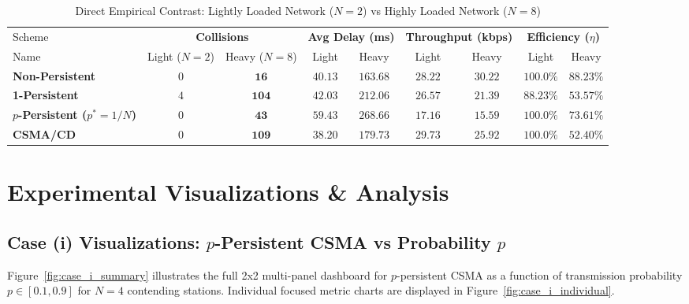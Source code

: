 \documentclass[11pt,a4paper]{article}
\begin{document}
\begin{table}[htbp]
\centering
\scriptsize
\renewcommand{\arraystretch}{1.2}
\begin{tabular}{l | c c | c c | c c | c c}
\rowcolor{tableheader}
\color{white}Scheme & \multicolumn{2}{c|}{\color{white}\textbf{Collisions}} & \multicolumn{2}{c|}{\color{white}\textbf{Avg Delay (ms)}} & \multicolumn{2}{c|}{\color{white}\textbf{Throughput (kbps)}} & \multicolumn{2}{c}{\color{white}\textbf{Efficiency ($\eta$)}} \\
\rowcolor{tableheader}
\color{white}Name & \color{white}Light ($N=2$) & \color{white}Heavy ($N=8$) & \color{white}Light & \color{white}Heavy & \color{white}Light & \color{white}Heavy & \color{white}Light & \color{white}Heavy \\
\hline
\textbf{Non-Persistent} & $0$ & $\mathbf{16}$ & $40.13$ & $\mathbf{163.68}$ & $28.22$ & $\mathbf{30.22}$ & $100.0\%$ & $\mathbf{88.23\%}$ \\
\textbf{1-Persistent} & $4$ & $\mathbf{104}$ & $42.03$ & $\mathbf{212.06}$ & $26.57$ & $\mathbf{21.39}$ & $88.23\%$ & $\mathbf{53.57\%}$ \\
\textbf{$p$-Persistent ($p^*=1/N$)} & $0$ & $\mathbf{43}$ & $59.43$ & $\mathbf{268.66}$ & $17.16$ & $\mathbf{15.59}$ & $100.0\%$ & $\mathbf{73.61\%}$ \\
\textbf{CSMA/CD} & $0$ & $\mathbf{109}$ & $38.20$ & $\mathbf{179.73}$ & $29.73$ & $\mathbf{25.92}$ & $100.0\%$ & $\mathbf{52.40\%}$ \\
\bottomrule
\end{tabular}
\caption{Direct Empirical Contrast: Lightly Loaded Network ($N=2$) vs Highly Loaded Network ($N=8$)}
\label{tab:light_heavy_comparison}
\end{table}

\section{Experimental Visualizations \& Analysis}

\subsection{Case (i) Visualizations: $p$-Persistent CSMA vs Probability $p$}
Figure~\ref{fig:case_i_summary} illustrates the full 2x2 multi-panel dashboard for $p$-persistent CSMA as a function of transmission probability $p \in [0.1, 0.9]$ for $N=4$ contending stations. Individual focused metric charts are displayed in Figure~\ref{fig:case_i_individual}.
\end{document}
